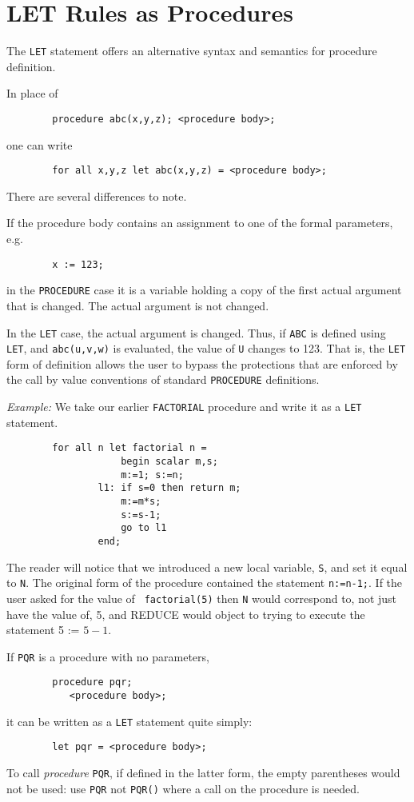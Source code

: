 \documentclass[11pt,letterpaper]{book}
\makeatletter
\newcommand{\REDUCE}{REDUCE}
\newcommand{\underscore}{\_}
\newcommand{\ttindex}[1]{{\renewcommand{\_}{\protect\underscore}%
                          \index{#1@{\tt #1}}}}
\makeatother
\begin{document}
\section{LET Rules as Procedures}

The {\tt LET}\ttindex{LET} statement offers an alternative syntax and
semantics for procedure definition.

In place of
{\small\begin{verbatim}
        procedure abc(x,y,z); <procedure body>;
\end{verbatim}}
one can write
{\small\begin{verbatim}
        for all x,y,z let abc(x,y,z) = <procedure body>;
\end{verbatim}}
There are several differences to note.

If the procedure body contains an assignment to one of the formal
parameters, e.g.
{\small\begin{verbatim}
        x := 123;
\end{verbatim}}
in the {\tt PROCEDURE} case it is a variable holding a copy of the first
actual argument that is changed.  The actual argument is not changed.

In the {\tt LET} case, the actual argument is changed.  Thus, if {\tt ABC}
is defined using {\tt LET}, and {\tt abc(u,v,w)} is evaluated, the value
of {\tt U} changes to 123.  That is, the {\tt LET} form of definition
allows the user to bypass the protections that are enforced by the call
by value conventions of standard {\tt PROCEDURE} definitions.

{\it Example:}  We take our earlier {\tt FACTORIAL}\ttindex{FACTORIAL}
procedure and write it as a {\tt LET} statement.
{\small\begin{verbatim}
        for all n let factorial n =
                    begin scalar m,s;
                    m:=1; s:=n;
                l1: if s=0 then return m;
                    m:=m*s;
                    s:=s-1;
                    go to l1
                end;
\end{verbatim}}
The reader will notice that we introduced a new local variable, {\tt S},
and set it equal to {\tt N}.  The original form of the procedure contained
the statement {\tt n:=n-1;}.  If the user asked for the value of {\tt
factorial(5)} then {\tt N} would correspond to, not just have the value
of, 5, and {\REDUCE} would object to trying to execute the statement
5 := $5-1$.

If {\tt PQR} is a procedure with no parameters,
{\small\begin{verbatim}
        procedure pqr;
           <procedure body>;
\end{verbatim}}
it can be written as a {\tt LET} statement quite simply:
{\small\begin{verbatim}
        let pqr = <procedure body>;
\end{verbatim}}
To call {\em procedure\/} {\tt PQR}, if defined in the latter form, the empty
parentheses would not be used: use {\tt PQR} not {\tt PQR()} where a call
on the procedure is needed.
\end{document}
